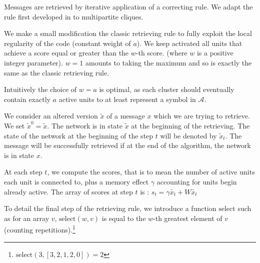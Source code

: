 \documentclass[english,10pt,twocolumn]{IEEEtran}
\theoremstyle{definition}
\begin{document}
		Messages are retrieved by iterative application of a correcting rule. We adapt the rule first developed in \cite{GriBer20117} to multipartite cliques.
		
%		
%	
		

		We make a small modification the classic retrieving rule to fully exploit the local regularity of the code (constant weight of $a$). We keep activated all units that achieve a score equal or greater than the $w$-th score. (where $w$ is a positive integer parameter). $w = 1$ amounts to taking the maximum and so is exactly the same as the classic retrieving rule.
		
		
		
		Intuitively the choice of $w = a$ is optimal, as each cluster should eventually contain exactly $a$ active units to at least represent a symbol in $\mathcal{A}$. %
		
		
		We consider an altered version $\tilde{x}$ of a message $x$ which we are trying to retrieve. We set $\tilde{x}^0 = \tilde{x}$. The network is in state $\tilde{x}$ at the beginning of the retrieving. The state of the network at the beginning of the step $t$ will be denoted by $\tilde{x}_t$. The message will be successfully retrieved if at the end of the algorithm, the network is in state $x$.
		
		At each step $t$, we compute the scores, that is to mean the number of active units each unit is connected to, plus a memory effect $\gamma $ accounting for units begin already active. The array of scores at step $t$ is :  $s_{t} = \gamma \tilde{x_{t}} + W \tilde{x_{t}}$
		
		To detail the final step of the retrieving rule, we introduce a function $\mbox{select}$ such as for an array $v$, $\mbox{select}(w, v)$ is equal to the $w$-th greatest element of $v$ (counting repetitions).\footnote{$\mbox{select}(3, [3,2,1,2,0]) = 2$}
		
\end{document}

